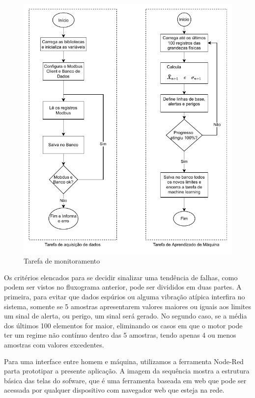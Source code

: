 \begin{figure}[H]
    \caption{Tarefa de monitoramento}
    \begin{center}
        \includegraphics[scale=1, page=2]{metodologia/img/software.pdf}
    \end{center}
    \label{fig:monitoramento}
\end{figure}

Os critérios elencados para se decidir sinalizar uma tendência de falhas, como podem ser vistos no fluxograma anterior, pode ser divididos
em duas partes. A primeira, para evitar que dados espúrios ou alguma vibração atípica interfira no sistema, somente se 5 amostras apresentarem 
valores maiores ou iguais aos limites um sinal de alerta, ou perigo, um sinal será gerado. No segundo caso, se a média dos últimos 100 elementos
for maior, eliminando os casos em que o motor pode ter um regime não contínuo dentro das 5 amostras, tendo apenas 4 ou menos amostras com valores
excedentes.

Para uma interface entre homem e máquina, utilizamos a ferramenta Node-Red parta prototipar a presente aplicação. A imagem da sequência mostra 
a estrutura básica das telas do sofware, que é uma ferramenta baseada em web que pode ser acessada por qualquer dispositivo com navegador web que esteja
na rede.

